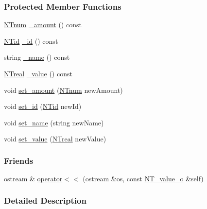 \subsubsection*{Protected Member Functions}
\begin{DoxyCompactItemize}
\item 
\hyperlink{nt__types_8h_a2b739eac0beddc8a5dac5311c2ba7320}{NTnum} \hyperlink{class_n_t__value__o_a71c64e2d0e07a9f8c2d4fc1f5711633e}{\_\-amount} () const 
\item 
\hyperlink{nt__types_8h_ab5cab5f78fdd2211c340cbe527a4afd7}{NTid} \hyperlink{class_n_t__value__o_a0b57739412c3e1d5906d8026da0679ef}{\_\-id} () const 
\item 
string \hyperlink{class_n_t__value__o_a955d4bbe61300765765e7885b08a61a0}{\_\-name} () const 
\item 
\hyperlink{nt__types_8h_a814a97893e9deb1eedcc7604529ba80d}{NTreal} \hyperlink{class_n_t__value__o_ab3e729cc52c58d65ebe1bde965d9bc54}{\_\-value} () const 
\item 
void \hyperlink{class_n_t__value__o_a95cbc335292441a2d7cbb5dff3c8ef0e}{set\_\-amount} (\hyperlink{nt__types_8h_a2b739eac0beddc8a5dac5311c2ba7320}{NTnum} newAmount)
\item 
void \hyperlink{class_n_t__value__o_a4f243bff9e55be59e5d1b4b78ec12082}{set\_\-id} (\hyperlink{nt__types_8h_ab5cab5f78fdd2211c340cbe527a4afd7}{NTid} newId)
\item 
void \hyperlink{class_n_t__value__o_a418293b7ca0519d33c559b8de05e6996}{set\_\-name} (string newName)
\item 
void \hyperlink{class_n_t__value__o_ad9cbff6d274d1d9faab46d056c56f6d7}{set\_\-value} (\hyperlink{nt__types_8h_a814a97893e9deb1eedcc7604529ba80d}{NTreal} newValue)
\end{DoxyCompactItemize}
\subsubsection*{Friends}
\begin{DoxyCompactItemize}
\item 
ostream \& \hyperlink{class_n_t__value__o_a96096b8df3c89f68a40e42a08dd988ad}{operator$<$$<$} (ostream \&os, const \hyperlink{class_n_t__value__o}{NT\_\-value\_\-o} \&self)
\end{DoxyCompactItemize}


\subsubsection{Detailed Description}



